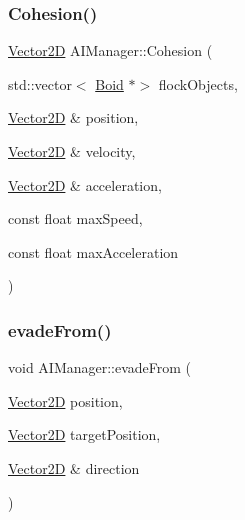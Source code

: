 \hypertarget{class_a_i_manager_ae70e083ab30b71c15384f5bdb345b462}{}\label{class_a_i_manager_ae70e083ab30b71c15384f5bdb345b462} 
\subsubsection{\texorpdfstring{Cohesion()}{Cohesion()}}
{\footnotesize\ttfamily \hyperlink{class_vector2_d}{Vector2D} A\+I\+Manager\+::\+Cohesion (\begin{DoxyParamCaption}\item[{std\+::vector$<$ \hyperlink{class_boid}{Boid} $\ast$$>$}]{flock\+Objects,  }\item[{\hyperlink{class_vector2_d}{Vector2D} \&}]{position,  }\item[{\hyperlink{class_vector2_d}{Vector2D} \&}]{velocity,  }\item[{\hyperlink{class_vector2_d}{Vector2D} \&}]{acceleration,  }\item[{const float}]{max\+Speed,  }\item[{const float}]{max\+Acceleration }\end{DoxyParamCaption})\hspace{0.3cm}{\ttfamily [static]}}

\hypertarget{class_a_i_manager_a9b04dd523dfb195990b365bacfcd1e92}{}\label{class_a_i_manager_a9b04dd523dfb195990b365bacfcd1e92} 
\subsubsection{\texorpdfstring{evade\+From()}{evadeFrom()}}
{\footnotesize\ttfamily void A\+I\+Manager\+::evade\+From (\begin{DoxyParamCaption}\item[{\hyperlink{class_vector2_d}{Vector2D}}]{position,  }\item[{\hyperlink{class_vector2_d}{Vector2D}}]{target\+Position,  }\item[{\hyperlink{class_vector2_d}{Vector2D} \&}]{direction }\end{DoxyParamCaption})\hspace{0.3cm}{\ttfamily [static]}}

\hypertarget{class_a_i_manager_ac57a276bbab23a0db4aafe9392dea156}{}\label{class_a_i_manager_ac57a276bbab23a0db4aafe9392dea156} 
